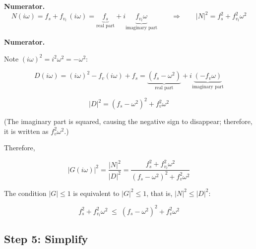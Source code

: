 \documentclass[11pt,a4paper,openany]{book}
\numberwithin{equation}{chapter}
\numberwithin{figure}{chapter}
\numberwithin{table}{chapter}
\begin{document}
\textbf{Numerator.}
\begin{equation}
N(i\omega) = f_s + f_{v_l}\,(i\omega) = \underbrace{f_s}_{\text{real part}} + i\underbrace{f_{v_l}\omega}_{\text{imaginary part}}
\qquad\Longrightarrow\qquad
\left|N\right|^2 = f_s^2 + f_{v_l}^2\omega^2
\end{equation}

\textbf{Numerator.}




Note $(i\omega)^2 = i^2\omega^2 = -\omega^2$:

\begin{equation}
D(i\omega) = (i\omega)^2 - f_v(i\omega) + f_s
= \underbrace{\left(f_s-\omega^2\right)}_{\text{real part}} + i\underbrace{\left(-f_v\omega\right)}_{\text{imaginary part}}
\end{equation}

\begin{equation}
\left|D\right|^2 = \left(f_s-\omega^2\right)^2 + f_v^2\omega^2
\end{equation}




(The imaginary part is squared, causing the negative sign to disappear; therefore, it is written as $f_v^2\omega^2$.)




Therefore,

\begin{equation}
\left|G(i\omega)\right|^2 = \frac{\left|N\right|^2}{\left|D\right|^2}
= \frac{f_s^2 + f_{v_l}^2\omega^2}{\left(f_s-\omega^2\right)^2 + f_v^2\omega^2}
\end{equation}




The condition $\left|G\right|\le1$ is equivalent to $\left|G\right|^2\le1$, that is, $\left|N\right|^2\le\left|D\right|^2$:







\begin{tcolorbox}[keybox,title=\textbf{Magnitude condition}]
\begin{equation}
f_s^2 + f_{v_l}^2\omega^2
\;\le\;
\left(f_s-\omega^2\right)^2 + f_v^2\omega^2
\end{equation}
\end{tcolorbox}

\subsection{Step 5: Simplify}
\end{document}
